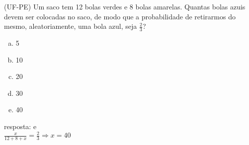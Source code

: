 \begin{ex}
  (UF-PE) Um saco tem 12 bolas verdes e 8 bolas amarelas. Quantas bolas azuis devem ser colocadas no saco, de modo que a probabilidade de retirarmos do mesmo, aleatoriamente, uma bola azul, seja $\frac{2}{3}$?
    \begin{enumerate}[(a)]
    \item 5
    \item 10
    \item 20
    \item 30
    \item 40
    \end{enumerate}
      \begin{sol}
       resposta: e \\
       $\frac{x}{12+8+x}=\frac{2}{3}\Longrightarrow x =40$
      \end{sol}
\end{ex}